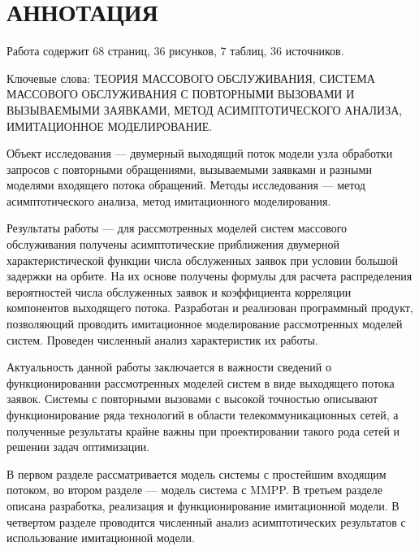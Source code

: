 \section*{\normalsize\centering АННОТАЦИЯ}
Работа содержит 68 страниц, 36 рисунков, 7 таблиц, 36 источников.
 
Ключевые слова: ТЕОРИЯ МАССОВОГО ОБСЛУЖИВАНИЯ, СИСТЕМА МАССОВОГО ОБСЛУЖИВАНИЯ С ПОВТОРНЫМИ ВЫЗОВАМИ И ВЫЗЫВАЕМЫМИ ЗАЯВКАМИ, МЕТОД АСИМПТОТИЧЕСКОГО АНАЛИЗА, ИМИТАЦИОННОЕ МОДЕЛИРОВАНИЕ.

Объект исследования --- двумерный выходящий поток модели узла обработки запросов с повторными обращениями, вызываемыми заявками и разными моделями входящего потока обращений.
Методы исследования --- метод асимптотического анализа, метод имитационного моделирования. 

Результаты работы --- для рассмотренных моделей систем массового обслуживания получены асимптотические приближения двумерной характеристической функции числа обслуженных заявок при условии большой задержки на орбите. На их основе получены формулы для расчета распределения вероятностей числа обслуженных заявок и коэффициента корреляции компонентов выходящего потока. Разработан и реализован программный продукт, позволяющий проводить имитационное моделирование рассмотренных моделей систем. Проведен численный анализ характеристик их работы.

Актуальность данной работы заключается в важности сведений о функционировании рассмотренных моделей систем в виде выходящего потока заявок. Системы с повторными вызовами с высокой точностью описывают функционирование ряда технологий в области телекоммуникационных сетей, а полученные результаты крайне важны при проектировании такого рода сетей и решении задач оптимизации.

В первом разделе рассматривается модель системы с простейшим входящим потоком, во втором разделе --- модель система с MMPP. В третьем разделе описана разработка, реализация и функционирование имитационной модели. В четвертом разделе проводится численный анализ асимптотических результатов с использование имитационной модели.

\thispagestyle{empty} %
\clearpage